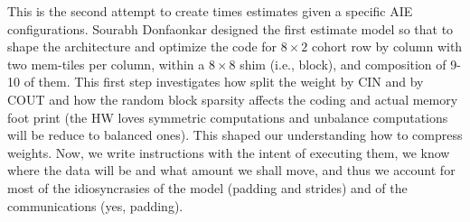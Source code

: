 \documentclass[conference]{IEEEtran}
\begin{document}
This is the second attempt to create times estimates given a specific
AIE configurations. Sourabh Donfaonkar designed the first estimate
model so that to shape the architecture and optimize the code for
$8\times 2$ cohort row by column with two mem-tiles per column, within
a $8\times 8$ shim (i.e., block), and composition of 9-10 of
them. This first step investigates how split the weight by CIN and by
COUT and how the random block sparsity affects the coding and actual
memory foot print (the HW loves symmetric computations and unbalance
computations will be reduce to balanced ones). This shaped our
understanding how to compress weights. Now, we write instructions with
the intent of executing them, we know where the data will be and what
amount we shall move, and thus we account for most of the
idiosyncrasies of the model (padding and strides) and of the
communications (yes, padding).
\end{document}
